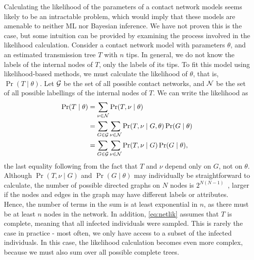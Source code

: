 Calculating the likelihood of the parameters of a contact network models seems
likely to be an intractable problem, which would imply that these models are
amenable to neither \gls{ML} nor Bayesian inference. We have not proven this is
the case, but some intuition can be provided by examining the process involved
in the likelihood calculation. Consider a contact network model with parameters
$\theta$, and an estimated transmission tree $T$ with $n$ tips. In general, we
do not know the labels of the internal nodes of $T$, only the labels of its
tips. To fit this model using likelihood-based methods, we must calculate the
likelihood of $\theta$, that is, $\Pr(T \mid \theta)$. Let $\mathcal{G}$ be the set of
all possible contact networks, and $\mathcal{N}$ be the set of all possible labellings
of the internal nodes of $T$. We can write the likelihood as
\begin{align}
\begin{split}
  \label{eq:netlik}
  \Pr(T \mid \theta)
    &= \sum_{\nu \in \mathcal{N}} \Pr(T, \nu \mid \theta) \\
    &= \sum_{G \in \mathcal{G}} \sum_{\nu \in \mathcal{N}} \Pr(T, \nu \mid G, \theta) \Pr(G \mid \theta) \\
    &= \sum_{G \in \mathcal{G}} \sum_{\nu \in \mathcal{N}} \Pr(T, \nu \mid G) \Pr(G \mid \theta),
\end{split}
\end{align}
the last equality following from the fact that $T$ and $\nu$ depend only on
$G$, not on $\theta$. Although $\Pr(T, \nu \mid G)$ and $\Pr(G \mid \theta)$
may individually be straightforward to calculate, the number of possible
directed graphs on $N$ nodes is $2^{N(N-1)}$~\autocite{harary2014graphical},
larger if the nodes and edges in the graph may have different labels or
attributes. Hence, the number of terms in the sum is at least exponential in
$n$, as there must be at least $n$ nodes in the network. In addition,
\cref{eq:netlik} assumes that $T$ is complete, meaning that all infected
individuals were sampled. This is rarely the case in practice - most often, we
only have access to a subset of the infected individuals. In this case, the
likelihood calculation becomes even more complex, because we must also sum over
all possible complete trees.

